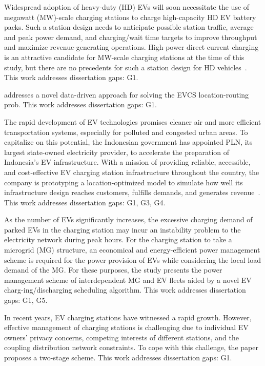 \documentclass[letterpaper, 12pt, oneside, doublespacing]{Thesis}
\begin{document}
\noindent Widespread adoption of heavy-duty (HD) EVs will soon necessitate the use of megawatt (MW)-scale charging stations to charge high-capacity HD EV battery packs. Such a station design needs to anticipate possible station traffic, average and peak power demand, and charging/wait time targets to improve throughput and maximize revenue-generating operations. High-power direct current charging is an attractive candidate for MW-scale charging stations at the time of this study, but there are no precedents for such a station design for HD vehicles~\cite{a_framework_2022}. This work addresses dissertation gaps: G1.



\noindent \cite{a_novel_2022} addresses a novel data-driven approach for solving the EVCS location-routing prob. This work addresses dissertation gaps: G1.



\noindent The rapid development of EV technologies promises cleaner air and more efficient transportation systems, especially for polluted and congested urban areas. To capitalize on this potential, the Indonesian government has appointed PLN, its largest state-owned electricity provider, to accelerate the preparation of Indonesia's EV infrastructure. With a mission of providing reliable, accessible, and cost-effective EV charging station infrastructure throughout the country, the company is prototyping a location-optimized model to simulate how well its infrastructure design reaches customers, fulfills demands, and generates revenue~\cite{designing_an_2022}. This work addresses dissertation gaps: G1, G3, G4.



\noindent As the number of EVs significantly increases, the excessive charging demand of parked EVs in the charging station may incur an instability problem to the electricity network during peak hours. For the charging station to take a microgrid (MG) structure, an economical and energy-efficient power management scheme is required for the power provision of EVs while considering the local load demand of the MG. For these purposes, the study \cite{development_of_2022} presents the power management scheme of interdependent MG and EV fleets aided by a novel EV charg-ing/discharging scheduling algorithm. This work addresses dissertation gaps: G1, G5.



\noindent In recent years, EV charging stations have witnessed a rapid growth. However, effective management of charging stations is challenging due to individual EV owners' privacy concerns, competing interests of different stations, and the coupling distribution network constraints. To cope with this challenge, the paper \cite{distributed_coordination_2022} proposes a two-stage scheme. This work addresses dissertation gaps: G1.
\end{document}
